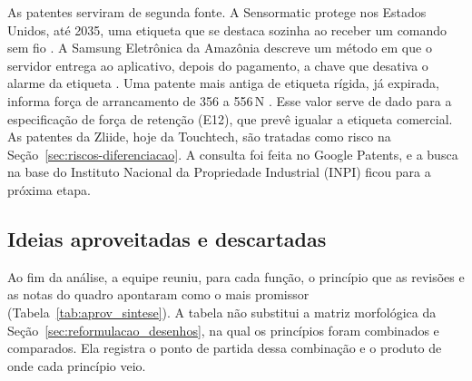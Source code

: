 As patentes serviram de segunda fonte. A Sensormatic protege nos Estados Unidos, até 2035, uma etiqueta que se destaca sozinha ao receber um comando sem fio \cite{googlepatents2018us10121339}. A Samsung Eletrônica da Amazônia descreve um método em que o servidor entrega ao aplicativo, depois do pagamento, a chave que desativa o alarme da etiqueta \cite{googlepatents2020us10586228}. Uma patente mais antiga de etiqueta rígida, já expirada, informa força de arrancamento de 356 a 556\,N \cite{googlepatents2006us7148805}. Esse valor serve de dado para a especificação de força de retenção (E12), que prevê igualar a etiqueta comercial. As patentes da Zliide, hoje da Touchtech, são tratadas como risco na Seção~\ref{sec:riscos-diferenciacao}. A consulta foi feita no Google Patents, e a busca na base do Instituto Nacional da Propriedade Industrial (INPI) ficou para a próxima etapa.

\subsection{Ideias aproveitadas e descartadas}
\label{subsec:aprov_sintese}

Ao fim da análise, a equipe reuniu, para cada função, o princípio que as revisões e as notas do quadro apontaram como o mais promissor (Tabela~\ref{tab:aprov_sintese}). A tabela não substitui a matriz morfológica da Seção~\ref{sec:reformulacao_desenhos}, na qual os princípios foram combinados e comparados. Ela registra o ponto de partida dessa combinação e o produto de onde cada princípio veio.

